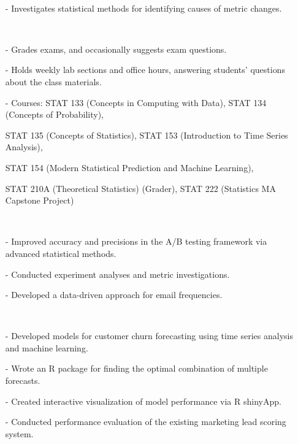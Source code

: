 \documentclass{res}
\begin{document}
\begin{resume}
     \\ 
            \begin{itemize}\setlength\itemsep{0em}
        \item[-] Investigates statistical methods for identifying causes of metric changes.
        \end{itemize}
  

     \\ 
            \begin{itemize}\setlength\itemsep{0em}
        \item[-] Grades exams, and occasionally suggests exam questions. 
        \item[-] Holds weekly lab sections and office hours, answering students' questions about the class materials.
        \item[-] Courses: STAT 133 (Concepts in Computing with Data), STAT 134 (Concepts of Probability), 
        \item[] STAT 135 (Concepts of Statistics), 
        STAT 153 (Introduction to Time Series Analysis), 
        \item[] STAT 154 (Modern Statistical Prediction and Machine Learning), 
        \item[] STAT 210A (Theoretical Statistics) (Grader), 
         STAT 222 (Statistics MA Capstone Project)
        \end{itemize}
  
     \\
    \begin{itemize}
     \item[-] Improved accuracy and precisions in the A/B testing framework via advanced statistical methods.
     \item[-] Conducted experiment analyses and metric investigations.
     \item[-] Developed a data-driven approach for email frequencies.
     \end{itemize}  
   
     \\
    \begin{itemize}
     \item[-] Developed models for customer churn forecasting using time series analysis and machine learning.
     \item[-] Wrote an R package for finding the optimal combination of multiple forecasts.
     \item[-] Created interactive visualization of model performance via R shinyApp.
     \item[-] Conducted performance evaluation of the existing marketing lead scoring system.
     \end{itemize}
     

\end{resume}
\end{document}
